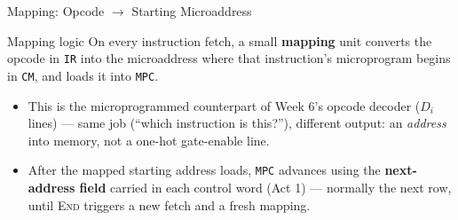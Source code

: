 \documentclass[aspectratio=169]{beamer}
\begin{document}
\begin{frame}{Mapping: Opcode $\to$ Starting Microaddress}
  \begin{block}{Mapping logic}
    On every instruction fetch, a small \textbf{mapping} unit converts the
    opcode in \texttt{IR} into the microaddress where that instruction's
    microprogram begins in \texttt{CM}, and loads it into \texttt{MPC}.
  \end{block}
  \begin{itemize}
    \item This is the microprogrammed counterpart of Week 6's opcode decoder
      ($D_i$ lines) --- same job (``which instruction is this?''), different
      output: an \emph{address} into memory, not a one-hot gate-enable line.
    \item After the mapped starting address loads, \texttt{MPC} advances using
      the \textbf{next-address field} carried in each control word (Act 1) ---
      normally the next row, until \textsc{End} triggers a new fetch and a
      fresh mapping.
  \end{itemize}
\end{frame}
\end{document}

